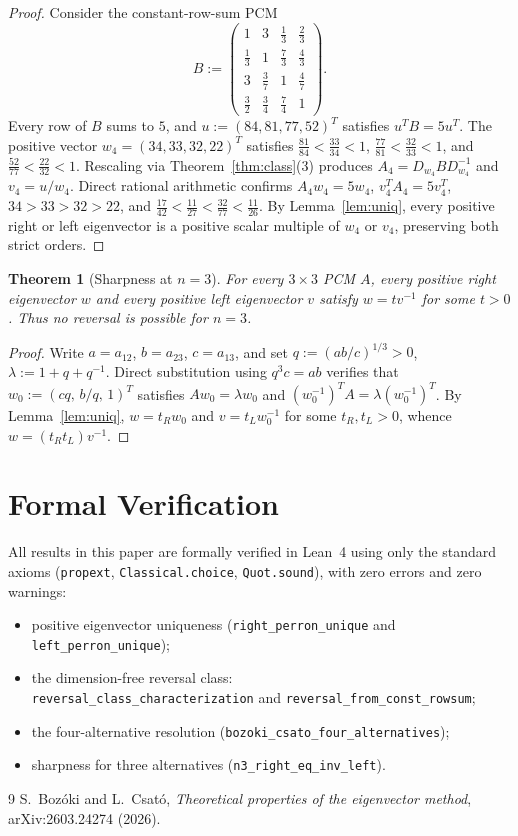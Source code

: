 \documentclass[11pt]{article}
\newtheorem{theorem}{Theorem}
\begin{document}
\begin{proof}
Consider the constant-row-sum PCM
\[
B := \begin{pmatrix}
1 & 3 & \frac{1}{3} & \frac{2}{3} \\[3pt]
\frac{1}{3} & 1 & \frac{7}{3} & \frac{4}{3} \\[3pt]
3 & \frac{3}{7} & 1 & \frac{4}{7} \\[3pt]
\frac{3}{2} & \frac{3}{4} & \frac{7}{4} & 1
\end{pmatrix}.
\]
Every row of $B$ sums to $5$, and $u := (84, 81, 77, 52)^T$ satisfies
$u^T B = 5 u^T$. The positive vector $w_4 = (34, 33, 32, 22)^T$ satisfies
$\frac{81}{84} < \frac{33}{34} < 1$, $\frac{77}{81} < \frac{32}{33} < 1$, and
$\frac{52}{77} < \frac{22}{32} < 1$. Rescaling via Theorem~\ref{thm:class}(3)
produces $A_4 = D_{w_4} B D_{w_4}^{-1}$ and $v_4 = u / w_4$. Direct rational
arithmetic confirms $A_4 w_4 = 5 w_4$, $v_4^T A_4 = 5 v_4^T$,
$34 > 33 > 32 > 22$, and
$\frac{17}{42} < \frac{11}{27} < \frac{32}{77} < \frac{11}{26}$. By
Lemma~\ref{lem:uniq}, every positive right or left eigenvector is a positive
scalar multiple of $w_4$ or $v_4$, preserving both strict orders.
\end{proof}

\begin{theorem}[Sharpness at $n = 3$]\label{thm:sharp}
For every $3 \times 3$ PCM $A$, every positive right eigenvector $w$ and every
positive left eigenvector $v$ satisfy $w = t v^{-1}$ for some $t > 0$. Thus
no reversal is possible for $n = 3$.
\end{theorem}

\begin{proof}
Write $a = a_{12}$, $b = a_{23}$, $c = a_{13}$, and set
$q := (a b / c)^{1/3} > 0$, $\lambda := 1 + q + q^{-1}$. Direct substitution
using $q^3 c = a b$ verifies that $w_0 := (c q,\, b / q,\, 1)^T$ satisfies
$A w_0 = \lambda w_0$ and $(w_0^{-1})^T A = \lambda (w_0^{-1})^T$. By
Lemma~\ref{lem:uniq}, $w = t_R w_0$ and $v = t_L w_0^{-1}$ for some
$t_R, t_L > 0$, whence $w = (t_R t_L) v^{-1}$.
\end{proof}

\section{Formal Verification}

All results in this paper are formally verified in Lean~4 using only the
standard axioms (\texttt{propext}, \texttt{Classical.choice},
\texttt{Quot.sound}), with zero errors and zero warnings:
\begin{itemize}
\item positive eigenvector uniqueness (\texttt{right\_perron\_unique} and
\texttt{left\_perron\_unique});
\item the dimension-free reversal class:\\
\texttt{reversal\_class\_characterization} and
\texttt{reversal\_from\_const\_rowsum};
\item the four-alternative resolution
(\texttt{bozoki\_csato\_four\_alternatives});
\item sharpness for three alternatives (\texttt{n3\_right\_eq\_inv\_left}).
\end{itemize}

\begin{thebibliography}{9}
S.~Boz\'oki and L.~Csat\'o,
\emph{Theoretical properties of the eigenvector method},
arXiv:2603.24274 (2026).
\end{thebibliography}
\end{document}
